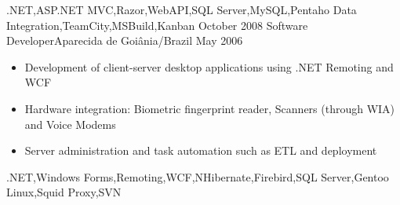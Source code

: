 \begin{experiences}
{\begin{itemize}
                      \end{itemize}
                    }
                    {.NET,ASP.NET MVC,Razor,WebAPI,SQL Server,MySQL,Pentaho Data Integration,TeamCity,MSBuild,Kanban}
  \emptySeparator
  \experience
    {October 2008} {Software Developer}{}{Aparecida de Goiânia/Brazil}
    {May 2006}     {
                     \begin{itemize}
                       \item Development of client-server desktop applications using .NET Remoting and WCF
                       \item Hardware integration: Biometric fingerprint reader, Scanners (through WIA) and Voice Modems
                       \item Server administration and task automation such as ETL and deployment
                     \end{itemize}
                   }
                   {.NET,Windows Forms,Remoting,WCF,NHibernate,Firebird,SQL Server,Gentoo Linux,Squid Proxy,SVN}
\end{experiences}